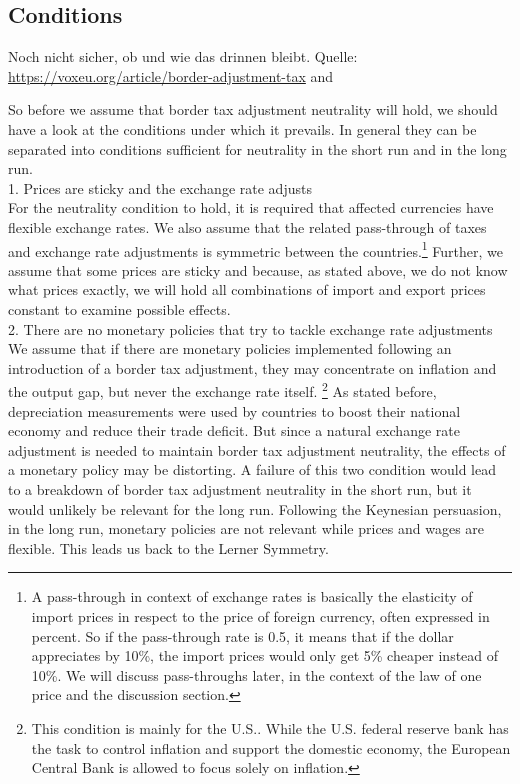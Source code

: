 \subsection{Conditions}

Noch nicht sicher, ob und wie das drinnen bleibt. 
Quelle: \url{https://voxeu.org/article/border-adjustment-tax} and \cite{barbiero2018macroeconomics}

So before we assume that border tax adjustment neutrality will hold, we should have a look at the conditions under which it prevails. In general they can be separated into conditions sufficient for neutrality in the short run and in the long run. \\
1. Prices are sticky and the exchange rate adjusts \\
For the neutrality condition to hold, it is required that affected currencies have flexible exchange rates. We also assume that the related pass-through of taxes and exchange rate adjustments is symmetric between the countries.\footnote{A pass-through in context of exchange rates is basically the elasticity of import prices in respect to the price of foreign currency, often expressed in percent. So if the pass-through rate is 0.5, it means that if the dollar appreciates by 10\%, the import prices would only get 5\% cheaper instead of 10\%. We will discuss pass-throughs later, in the context of the law of one price and the discussion section.} Further, we assume that some prices are sticky and because, as stated above, we do not know what prices exactly, we will hold all combinations of import and export prices constant to examine possible effects. \\
2. There are no monetary policies that try to tackle exchange rate adjustments \\
We assume that if there are monetary policies implemented following an introduction of a border tax adjustment, they may concentrate on inflation and the output gap, but never the exchange rate itself. \footnote{This condition is mainly for the U.S.. While the U.S. federal reserve bank has the task to control inflation and support the domestic economy, the European Central Bank is allowed to focus solely on inflation.} As stated before, depreciation measurements were used by countries to boost their national economy and reduce their trade deficit. But since a natural exchange rate adjustment is needed to maintain border tax adjustment neutrality, the effects of a monetary policy may be distorting.
A failure of this two condition would lead to a breakdown of border tax adjustment neutrality in the short run, but it would unlikely be relevant for the long run. Following the Keynesian persuasion, in the long run, monetary policies are not relevant while prices and wages are flexible. This leads us back to the Lerner Symmetry. \\
